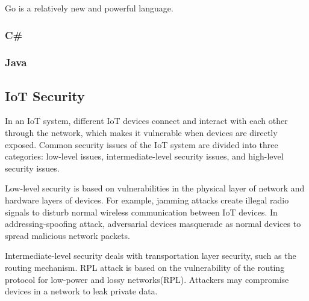 Go is a relatively new and powerful language. 

\subsubsection{C\#}

\subsubsection{Java}

\subsection{IoT Security}

In an IoT system, different IoT devices connect and interact with each other through the network, which makes it vulnerable when devices are directly exposed. 
Common security issues of the IoT system are divided into three categories: low-level issues, intermediate-level security issues, and high-level security issues.

Low-level security is based on vulnerabilities in the physical layer of network and hardware layers of devices. 
For example, jamming attacks create illegal radio signals to disturb normal wireless communication between IoT devices\cite{xu2005feasibility,noubir2003low}. 
In addressing-spoofing attack, adversarial devices masquerade as normal devices to spread malicious network packets\cite{chen2007detecting}.

Intermediate-level security deals with transportation layer security, such as the routing mechanism. 
RPL attack is based on the vulnerability of the routing protocol for low-power and lossy networks(RPL)\cite{dvir2011vera}. 
Attackers may compromise devices in a network to leak private data.

